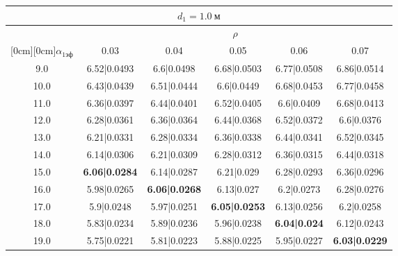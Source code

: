 \documentclass[20pt]{article}
\begin{document}
\begin{center}
\begin{tabular}{c|ccccc}
\hline
	\multicolumn{6}{c}{$d_{1}=1.0 \ м$} \\
\hline
	 & \multicolumn{5}{|c}{$\rho$} \\
	\cline{2-6}
	\raisebox{1.5ex}[0cm][0cm]{$\alpha_{1эф}$} & 0.03 & 0.04 & 0.05 & 0.06 & 0.07\\
\hline
	9.0 & 	6.52|0.0493 & 	6.6|0.0498 & 	6.68|0.0503 & 	6.77|0.0508 & 	6.86|0.0514\\
	10.0 & 	6.43|0.0439 & 	6.51|0.0444 & 	6.6|0.0449 & 	6.68|0.0453 & 	6.77|0.0458\\
	11.0 & 	6.36|0.0397 & 	6.44|0.0401 & 	6.52|0.0405 & 	6.6|0.0409 & 	6.68|0.0413\\
	12.0 & 	6.28|0.0361 & 	6.36|0.0364 & 	6.44|0.0368 & 	6.52|0.0372 & 	6.6|0.0376\\
	13.0 & 	6.21|0.0331 & 	6.28|0.0334 & 	6.36|0.0338 & 	6.44|0.0341 & 	6.52|0.0345\\
	14.0 & 	6.14|0.0306 & 	6.21|0.0309 & 	6.28|0.0312 & 	6.36|0.0315 & 	6.44|0.0318\\
	15.0 & 	\textbf{6.06|0.0284} & 	6.14|0.0287 & 	6.21|0.029 & 	6.28|0.0293 & 	6.36|0.0296\\
	16.0 & 	5.98|0.0265 & 	\textbf{6.06|0.0268} & 	6.13|0.027 & 	6.2|0.0273 & 	6.28|0.0276\\
	17.0 & 	5.9|0.0248 & 	5.97|0.0251 & 	\textbf{6.05|0.0253} & 	6.13|0.0256 & 	6.2|0.0258\\
	18.0 & 	5.83|0.0234 & 	5.89|0.0236 & 	5.96|0.0238 & 	\textbf{6.04|0.024} & 	6.12|0.0243\\
	19.0 & 	5.75|0.0221 & 	5.81|0.0223 & 	5.88|0.0225 & 	5.95|0.0227 & 	\textbf{6.03|0.0229}\\
\end{tabular}


\end{center}
\end{document}
